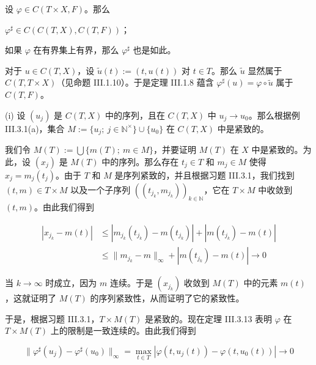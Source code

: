 \begin{theorem}

设 $ \varphi \in C(T \times X, F) $。那么

\begin{subitems}
\item

$ \varphi^{\sharp} \in C(C(T, X), C(T, F)) $；

\item

如果 $ \varphi $ 在有界集上有界，那么 $ \varphi^{\sharp} $ 也是如此。

\proofhead
对于 $ u \in C(T, X) $，设 $ \tilde{u}(t) := (t, u(t)) $ 对 $ t \in T $。那么 $ \tilde{u} $ 显然属于 $ C(T, T \times X) $（见命题 III.1.10）。于是定理 III.1.8 蕴含 $ \varphi^{\sharp}(u) = \varphi \circ \tilde{u} $ 属于 $ C(T, F) $。
\end{subitems}

(i) 设 $ (u_{j}) $ 是 $ C(T, X) $ 中的序列，且在 $ C(T, X) $ 中 $ u_{j} \to u_{0} $。那么根据例 III.3.1(a)，集合 $ M := \{ u_{j} ;\ j \in \mathbb{N}^{\times} \} \cup \{u_{0}\} $ 在 $ C(T, X) $ 中是紧致的。

我们令 $ M(T) := \bigcup\{ m(T) ;\ m \in M \} $，并要证明 $ M(T) $ 在 $ X $ 中是紧致的。为此，设 $ (x_{j}) $ 是 $ M(T) $ 中的序列。那么存在 $ t_{j} \in T $ 和 $ m_{j} \in M $ 使得 $ x_{j} = m_{j}(t_{j}) $。由于 $ T $ 和 $ M $ 是序列紧致的，并且根据习题 III.3.1，我们找到 $ (t, m) \in T \times M $ 以及一个子序列 $ ((t_{j_{k}}, m_{j_{k}}))_{k \in \mathbb{N}} $，它在 $ T \times M $ 中收敛到 $ (t, m) $。由此我们得到

\begin{equation*}
\begin{aligned}
|x_{j_{k}} - m(t)| &\le |m_{j_{k}}(t_{j_{k}}) - m(t_{j_{k}})| + |m(t_{j_{k}}) - m(t)| \\ &\le \|m_{j_{k}} - m\|_{\infty} + |m(t_{j_{k}}) - m(t)| \to 0
\end{aligned}
\end{equation*}

当 $ k \to \infty $ 时成立，因为 $ m $ 连续。于是 $ (x_{j_{k}}) $ 收敛到 $ M(T) $ 中的元素 $ m(t) $，这就证明了 $ M(T) $ 的序列紧致性，从而证明了它的紧致性。

于是，根据习题 III.3.1，$ T \times M(T) $ 是紧致的。现在定理 III.3.13 表明 $ \varphi $ 在 $ T \times M(T) $ 上的限制是一致连续的。由此我们得到

\[
\|\varphi^{\sharp}(u_{j}) - \varphi^{\sharp}(u_{0})\|_{\infty} = \max_{t \in T}\left|\varphi(t, u_{j}(t)) - \varphi(t, u_{0}(t))\right| \to 0
\]


\end{theorem}
